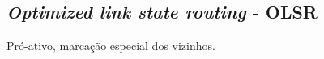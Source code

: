 \subsection{\textit{Optimized link state routing} - OLSR}
Pr\'o-ativo, marca\c{c}\~ao especial dos vizinhos.

